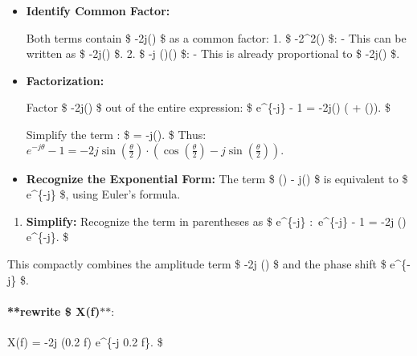 \documentclass[11pt]{article}
\providecommand{\tightlist}{%
      \setlength{\itemsep}{0pt}\setlength{\parskip}{0pt}}
\begin{document}
\begin{itemize}
\item
  \textbf{Identify Common Factor:}

  Both terms contain \$ -2j\sin\left(\right) \$ as a
  common factor: 1. \$ -2\sin\^{}2\left(\right) \$: -
  This can be written as \$ -2j\sin\left(\right)
  \cdot {} \$. 2. \$ -j
  \sin\left(\right)\cos\left(\right)
  \$: - This is already proportional to \$
  -2j\sin\left(\right) \$.
\item
  \textbf{Factorization:}

  Factor \$ -2j\sin\left(\right) \$ out of the entire
  expression: \$ e\^{}\{-j\theta\} - 1 =
  -2j\sin\left(\right)
  \cdot \left( +
  \cos\left(\right)\right). \$

  Simplify the term : \$  =
  -j\sin\left(\right). \$ Thus:
  \(e^{-j\theta} - 1 = -2j\sin\left(\frac{\theta}{2}\right) \cdot \left(\cos\left(\frac{\theta}{2}\right) - j\sin\left(\frac{\theta}{2}\right)\right).\)
\item
  \textbf{Recognize the Exponential Form:} The term \$
  \cos\left(\right) - j\sin\left(\right)
  \$ is equivalent to \$ e\^{}\{-j\} \$, using Euler's
  formula.
\end{itemize}

\begin{enumerate}
\def\labelenumi{\arabic{enumi}.}
\setcounter{enumi}{4}
\tightlist
\item
  \textbf{Simplify:} Recognize the term in parentheses as \$
  e\^{}\{-j\} \(:\) e\^{}\{-j\theta\} - 1 = -2j
  \sin\left(\right) e\^{}\{-j\}. \$
\end{enumerate}

This compactly combines the amplitude term \$ -2j
\sin\left(\right) \$ and the phase shift \$
e\^{}\{-j\} \$.

\paragraph{\texorpdfstring{**rewrite \$
X(f)\(** :\)}{**rewrite \$ X(f)** :}}\label{rewrite-xf}

X(f) =  \cdot -2j \sin(0.2 \pi f) e\^{}\{-j 0.2
\pi f\}. \$
\end{document}
